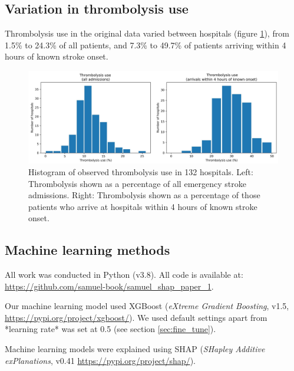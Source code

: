 \subsection{Variation in thrombolysis use}

Thrombolysis use in the original data varied between hospitals (figure \ref{fig:observed_thrombolysis_appendix}), from 1.5\% to 24.3\% of all patients, and 7.3\% to 49.7\% of patients arriving within 4 hours of known stroke onset.

\begin{figure}
\centering
\includegraphics[width=1.0\textwidth]{./images/thrombolysis_hist}
\caption{Histogram of observed thrombolysis use in 132 hospitals. Left: Thrombolysis shown as a percentage of all emergency stroke admissions. Right: Thrombolysis shown as a percentage of those patients who arrive at hospitals within 4 hours of known stroke onset.}
\label{fig:observed_thrombolysis_appendix}
\end{figure}

\subsection{Machine learning methods}

All work was conducted in Python (v3.8). All code is available at: \url{https://github.com/samuel-book/samuel_shap_paper_1}.

Our machine learning model used XGBoost (\emph{eXtreme Gradient Boosting}, v1.5, \url{https://pypi.org/project/xgboost/}). We used default settings apart from *learning rate* was set at 0.5 (see section \ref{sec:fine_tune}).

Machine learning models were explained using SHAP (\emph{SHapley Additive exPlanations}, v0.41 \url{https://pypi.org/project/shap/}). 


